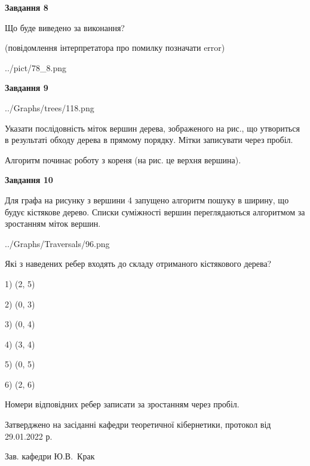 \documentclass[12pt, ukrainian]{article}
\begin{document}
{\begin {large}
{\begin {center}\textbf{Завдання 8}\end {center}}\par
Що буде виведено за виконання?\par
 (повідомлення інтерпретатора про помилку позначати error)\par
\begin{center}
	{../pict/78_8.png}
\end{center}
\newpage

{\begin {center}\textbf{Завдання 9}\end {center}}\par

\begin{center}
	{../Graphs/trees/118.png}
\end{center}
Указати послідовність міток вершин дерева, зображеного на рис., що утвориться в результаті обходу дерева в прямому порядку. Мітки записувати через пробіл.\par Алгоритм починає роботу з кореня (на рис. це верхня вершина).\par
\newpage

{\begin {center}\textbf{Завдання 10}\end {center}}\par
Для графа на рисунку з вершини 4 запущено алгоритм пошуку в ширину, що будує кістякове дерево. Списки суміжності вершин переглядаються алгоритмом за зростанням міток вершин.\par
\begin{center}
	{../Graphs/Traversals/96.png}
\end{center}
\par Які з наведених ребер входять до складу отриманого кістякового дерева?\par
1) (2, 5)\par
2) (0, 3)\par
3) (0, 4)\par
4) (3, 4)\par
5) (0, 5)\par
6) (2, 6)\par
{\vskip 15pt} Номери відповідних ребер записати за зростанням через пробіл.\par
\newpage


\end {large}
}
{\smallskip \begin {small} Затверджено на засіданні кафедри теоретичної кібернетики, протокол  від   29.01.2022 р.\par\smallskip\smallskip
{\parbox {6.5 cm}{Зав. кафедри \dotfill Ю.В.~Крак}} \end{small}}
\end{document}
